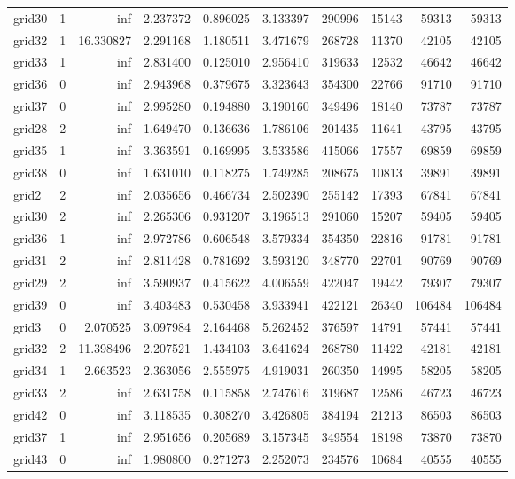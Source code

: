\begin{longtable}{|l|r|r|r|r|r|r|r|r|r|}
grid30 & 1 & inf & 2.237372 & 0.896025 & 3.133397 & 290996 & 15143 & 59313 & 59313 \\
grid32 & 1 & 16.330827 & 2.291168 & 1.180511 & 3.471679 & 268728 & 11370 & 42105 & 42105 \\
grid33 & 1 & inf & 2.831400 & 0.125010 & 2.956410 & 319633 & 12532 & 46642 & 46642 \\
grid36 & 0 & inf & 2.943968 & 0.379675 & 3.323643 & 354300 & 22766 & 91710 & 91710 \\
grid37 & 0 & inf & 2.995280 & 0.194880 & 3.190160 & 349496 & 18140 & 73787 & 73787 \\
grid28 & 2 & inf & 1.649470 & 0.136636 & 1.786106 & 201435 & 11641 & 43795 & 43795 \\
grid35 & 1 & inf & 3.363591 & 0.169995 & 3.533586 & 415066 & 17557 & 69859 & 69859 \\
grid38 & 0 & inf & 1.631010 & 0.118275 & 1.749285 & 208675 & 10813 & 39891 & 39891 \\
grid2 & 2 & inf & 2.035656 & 0.466734 & 2.502390 & 255142 & 17393 & 67841 & 67841 \\
grid30 & 2 & inf & 2.265306 & 0.931207 & 3.196513 & 291060 & 15207 & 59405 & 59405 \\
grid36 & 1 & inf & 2.972786 & 0.606548 & 3.579334 & 354350 & 22816 & 91781 & 91781 \\
grid31 & 2 & inf & 2.811428 & 0.781692 & 3.593120 & 348770 & 22701 & 90769 & 90769 \\
grid29 & 2 & inf & 3.590937 & 0.415622 & 4.006559 & 422047 & 19442 & 79307 & 79307 \\
grid39 & 0 & inf & 3.403483 & 0.530458 & 3.933941 & 422121 & 26340 & 106484 & 106484 \\
grid3 & 0 & 2.070525 & 3.097984 & 2.164468 & 5.262452 & 376597 & 14791 & 57441 & 57441 \\
grid32 & 2 & 11.398496 & 2.207521 & 1.434103 & 3.641624 & 268780 & 11422 & 42181 & 42181 \\
grid34 & 1 & 2.663523 & 2.363056 & 2.555975 & 4.919031 & 260350 & 14995 & 58205 & 58205 \\
grid33 & 2 & inf & 2.631758 & 0.115858 & 2.747616 & 319687 & 12586 & 46723 & 46723 \\
grid42 & 0 & inf & 3.118535 & 0.308270 & 3.426805 & 384194 & 21213 & 86503 & 86503 \\
grid37 & 1 & inf & 2.951656 & 0.205689 & 3.157345 & 349554 & 18198 & 73870 & 73870 \\
grid43 & 0 & inf & 1.980800 & 0.271273 & 2.252073 & 234576 & 10684 & 40555 & 40555 \\

\end{longtable}
